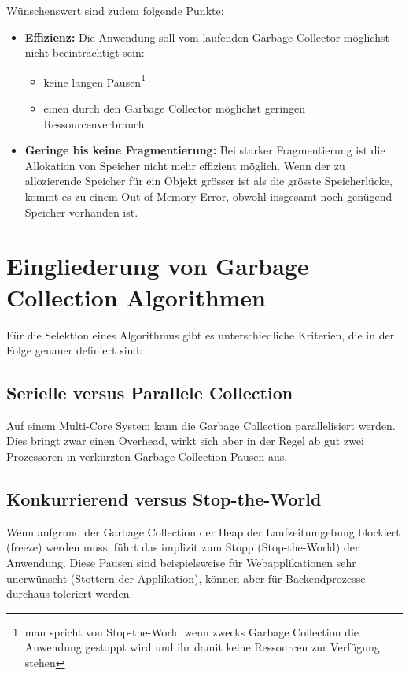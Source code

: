 Wünschenswert sind zudem folgende Punkte\cite[S. 4]{sunMemoryManagementWP}:
\begin{itemize}
	\item \textbf{Effizienz:} Die Anwendung soll vom laufenden Garbage Collector möglichst nicht beeinträchtigt sein: 
		\begin{itemize}
			\item keine langen Pausen\footnote{man spricht von Stop-the-World wenn zwecks Garbage Collection die Anwendung gestoppt wird und ihr damit keine Ressourcen zur Verfügung stehen}
			\item einen durch den Garbage Collector möglichst geringen Ressourcenverbrauch
		\end{itemize}
	\item \textbf{Geringe bis keine Fragmentierung:} Bei starker Fragmentierung ist die Allokation von Speicher nicht mehr effizient möglich. Wenn der zu allozierende Speicher für ein Objekt grösser ist als die grösste Speicherlücke, kommt es zu einem Out-of-Memory-Error, obwohl insgesamt noch genügend Speicher vorhanden ist. 
\end{itemize}

\section{Eingliederung von Garbage Collection Algorithmen}
Für die Selektion eines Algorithmus gibt es unterschiedliche Kriterien\cite[S. 5]{sunMemoryManagementWP}, die in der Folge genauer definiert sind:
\subsection{Serielle versus Parallele Collection}
Auf einem Multi-Core System kann die Garbage Collection parallelisiert werden. Dies bringt zwar einen Overhead, wirkt sich aber in der Regel ab gut zwei Prozessoren in verkürzten Garbage Collection Pausen aus.

\subsection{Konkurrierend versus Stop-the-World}
Wenn aufgrund der Garbage Collection der Heap der Laufzeitumgebung blockiert (freeze) werden muss, führt das implizit zum Stopp (Stop-the-World) der Anwendung. Diese Pausen sind beispielsweise für Webapplikationen sehr unerwünscht (Stottern der Applikation), können aber für Backendprozesse durchaus toleriert werden.


